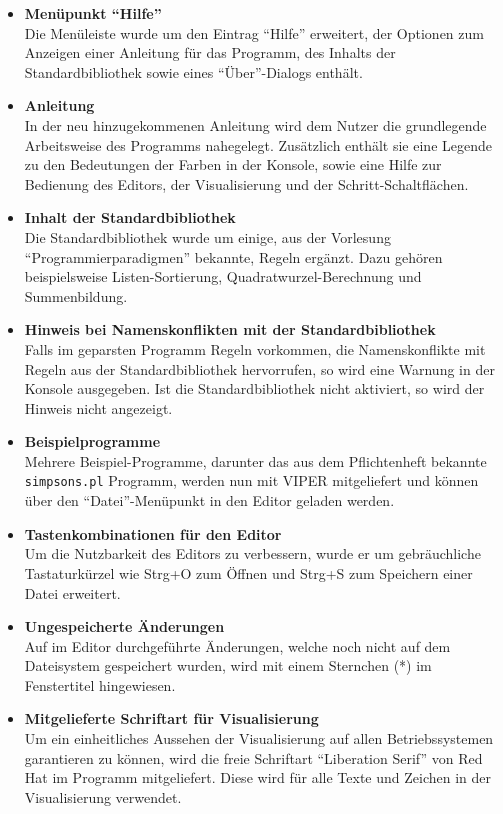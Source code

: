 \documentclass[parskip=full,11pt,twoside]{scrartcl}
\begin{document}
\begin{itemize}
  \item \textbf{Menüpunkt \enquote{Hilfe}}\\
        Die Menüleiste wurde um den Eintrag \enquote{Hilfe} erweitert, der Optionen zum Anzeigen einer Anleitung für das Programm, des Inhalts der Standardbibliothek sowie eines \enquote{Über}-Dialogs enthält.
  \item \textbf{Anleitung}\\
        In der neu hinzugekommenen Anleitung wird dem Nutzer die grundlegende Arbeitsweise des Programms nahegelegt. Zusätzlich enthält sie eine Legende zu den Bedeutungen der Farben in der Konsole, sowie eine Hilfe zur Bedienung des Editors, der Visualisierung und der Schritt-Schaltflächen.
  \item \textbf{Inhalt der Standardbibliothek}\\
        Die Standardbibliothek wurde um einige, aus der Vorlesung \enquote{Programmierparadigmen} bekannte, Regeln ergänzt. Dazu gehören beispielsweise Listen-Sortierung, Quadratwurzel-Berechnung und Summenbildung.
  \item \textbf{Hinweis bei Namenskonflikten mit der Standardbibliothek}\\
        Falls im geparsten Programm Regeln vorkommen, die Namenskonflikte mit Regeln aus der Standardbibliothek hervorrufen, so wird eine Warnung in der Konsole ausgegeben. Ist die Standardbibliothek nicht aktiviert, so wird der Hinweis nicht angezeigt.
  \item \textbf{Beispielprogramme}\\
        Mehrere Beispiel-Programme, darunter das aus dem Pflichtenheft bekannte \texttt{simpsons.pl} Programm, werden nun mit VIPER mitgeliefert und können über den \enquote{Datei}-Menüpunkt in den Editor geladen werden.
  \item \textbf{Tastenkombinationen für den Editor}\\
        Um die Nutzbarkeit des Editors zu verbessern, wurde er um gebräuchliche Tastaturkürzel wie Strg+O zum Öffnen und Strg+S zum Speichern einer Datei erweitert.
  \item \textbf{Ungespeicherte Änderungen}\\
        Auf im Editor durchgeführte Änderungen, welche noch nicht auf dem Dateisystem gespeichert wurden, wird mit einem Sternchen (*) im Fenstertitel hingewiesen.
  \item \textbf{Mitgelieferte Schriftart für Visualisierung}\\
        Um ein einheitliches Aussehen der Visualisierung auf allen Betriebssystemen garantieren zu können, wird die freie Schriftart \enquote{Liberation Serif} von Red Hat im Programm mitgeliefert. Diese wird für alle Texte und Zeichen in der Visualisierung verwendet.

\end{itemize}
\end{document}
